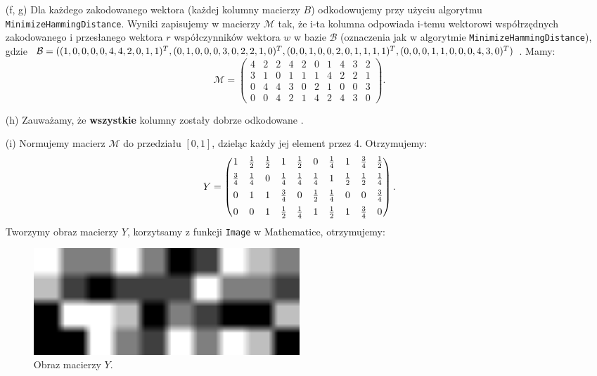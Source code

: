 \documentclass[10pt]{article} %
\begin{document}
\begin{enumerate}
\item[(f, g)] Dla każdego zakodowanego wektora (każdej kolumny macierzy $B$) odkodowujemy przy użyciu algorytmu \verb|MinimizeHammingDistance|. Wyniki zapisujemy w macierzy $\mathcal{M}$ tak, że i-ta kolumna odpowiada i-temu wektorowi współrzędnych zakodowanego i przesłanego wektora $r$ współczynników wektora $w$ w bazie $\mathcal{B}$ (oznaczenia jak w algorytmie \verb|MinimizeHammingDistance|), \\gdzie $\mathcal{B} = ((1,0,0,0,0,4,4,2,0,1,1)^T,(
0,1,0,0,0,3,0,2,2,1,0)^T,(
0,0,1,0,0,2,0,1,1,1,1)^T,\\(
0,0,0,1,1,0,0,0,4,3,0)^T)$. Mamy:
$$ \mathcal{M} = \begin{pmatrix} 4&2&2&4&2&0&1&4&3&2\\3&1&0&1&1&1&4&2&2&1\\0&4&4&3&0&2&1&0&0&3\\0&0&4&2&1&4&2&4&3&0 \end{pmatrix}.$$ 

\item[(h)] Zauważamy, że \textbf{wszystkie} kolumny zostały dobrze odkodowane \faSmile[regular].

\newpage

\item[(i)] Normujemy macierz $\mathcal{M}$ do przedziału $[0,1]$, dzieląc każdy jej element przez 4. Otrzymujemy:
$$Y = \begin{pmatrix} \vspace{5pt} 1&\frac{1}{2}&\frac{1}{2}&1&\frac{1}{2}&0&\frac{1}{4}&1&\frac{3}{4}&\frac{1}{2}\\ \vspace{5pt}
\frac{3}{4}&\frac{1}{4}&0&\frac{1}{4}&\frac{1}{4}&\frac{1}{4}&1&\frac{1}{2}&\frac{1}{2}&\frac{1}{4}\\ \vspace{5pt}
0&1&1&\frac{3}{4}&0&\frac{1}{2}&\frac{1}{4}&0&0&\frac{3}{4}\\
0&0&1&\frac{1}{2}&\frac{1}{4}&1&\frac{1}{2}&1&\frac{3}{4}&0\\ \end{pmatrix}.$$
Tworzymy obraz macierzy $Y$, korzytsamy z funkcji \verb|Image| w Mathematice, otrzymujemy:\\

\begin{figure}[h]
	\centering
    \includegraphics[width=0.5\textwidth]{image.png}
    \caption{Obraz macierzy $Y$.}
    \label{fig:example}
\end{figure}

\end{enumerate}
\end{document}
